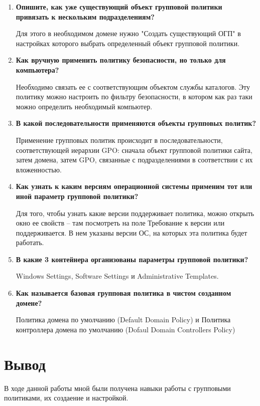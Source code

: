 \documentclass[a4paper]{article}
\begin{document}
  \begin{enumerate}
    \item {
      \textbf{Опишите, как уже существующий объект групповой политики привязать к нескольким подразделениям?}

      Для этого в необходимом домене нужно "Создать существующий ОГП" в настройках которого
      выбрать определенный объект групповой политики.
    }
    \item {
      \textbf{Как вручную применить политику безопасности, но только для компьютера?}

      Необходимо связать ее с соответствующим объектом службы каталогов. Эту политику
      можно настроить по фильтру безопасности, в котором как раз таки можно
      определить необходимый компьютер.
    }
    \item {
      \textbf{В какой последовательности применяются объекты групповых политик?}

      Применение групповых политик происходит в последовательности, соответствующей иерархии GPO: сначала объект групповой политики сайта, затем домена, затем GPO, связанные с подразделениями в соответствии с их вложенностью.
    }
    \item {
      \textbf{Как узнать к каким версиям операционной системы применим тот или иной параметр групповой политики?}

      Для того, чтобы узнать какие версии поддерживает политика, можно открыть окно ее свойств – там посмотреть на поле Требование к версии или поддерживается. В нем указаны версии ОС, на которых эта политика будет работать.
    }
    \item {
      \textbf{В какие 3 контейнера организованы параметры групповой политики?}

      Windows Settings, Software Settings и Administrative Templates.
    }
    \item {
      \textbf{Как называется базовая групповая политика в чистом созданном домене? }

      Политика домена по умолчанию (Default Domain Policy) и Политика контроллера домена
      по умолчанию (Dofaul Domain Controllers Policy)
    }
  \end{enumerate}

  \newpage
  \section{Вывод}

  В ходе данной работы мной были получена навыки работы с групповыми политиками, их создаение
  и настройкой.
\end{document}
